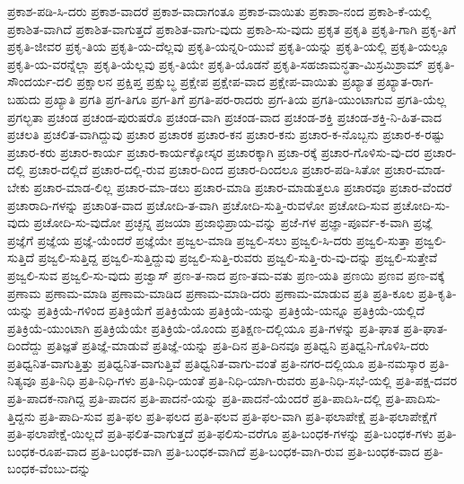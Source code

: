 {ಪ್ರಕಾಶ-ಪಡಿ-ಸಿ-ದರು
ಪ್ರಕಾಶ-ವಾದರೆ
ಪ್ರಕಾಶ-ವಾದಾಗಂತೂ
ಪ್ರಕಾಶ-ವಾಯಿತು
ಪ್ರಕಾಶಾ-ನಂದ
ಪ್ರಕಾಶಿ-ಕೆ-ಯಲ್ಲಿ
ಪ್ರಕಾಶಿತ-ವಾಗಿದೆ
ಪ್ರಕಾಶಿತ-ವಾಗುತ್ತದೆ
ಪ್ರಕಾಶಿತ-ವಾಗು-ವುದು
ಪ್ರಕಾಶಿ-ಸು-ವುದು
ಪ್ರಕೃತ
ಪ್ರಕೃತಿ
ಪ್ರಕೃತಿ-ಗಾಗಿ
ಪ್ರಕೃ-ತಿಗೆ
ಪ್ರಕೃತಿ-ಜೀವರ
ಪ್ರಕೃ-ತಿಯ
ಪ್ರಕೃತಿ-ಯ-ದೆಲ್ಲವು
ಪ್ರಕೃತಿ-ಯನ್ನರಿ-ಯುವೆ
ಪ್ರಕೃತಿ-ಯನ್ನು
ಪ್ರಕೃತಿ-ಯಲ್ಲಿ
ಪ್ರಕೃತಿ-ಯಲ್ಲೂ
ಪ್ರಕೃತಿ-ಯ-ವರನ್ನೆಲ್ಲಾ
ಪ್ರಕೃತಿ-ಯೆಲ್ಲವು
ಪ್ರಕೃ-ತಿಯೇ
ಪ್ರಕೃತಿ-ಯೊಡನೆ
ಪ್ರಕೃತಿ-ಸಹಜಾಮನ್ಧತಾ-ಮಿಸ್ರಮಿಶ್ರಾಮ್
ಪ್ರಕೃತಿ-ಸೌಂದರ್ಯ-ದಲಿ
ಪ್ರಕ್ಷಾಲನ
ಪ್ರಕ್ಷಿಪ್ತ
ಪ್ರಕ್ಷುಬ್ಧ
ಪ್ರಕ್ಷೇಪ
ಪ್ರಕ್ಷೇಪ-ವಾದ
ಪ್ರಕ್ಷೇಪ-ವಾಯಿತು
ಪ್ರಖ್ಯಾತ
ಪ್ರಖ್ಯಾತ-ರಾಗ-ಬಹುದು
ಪ್ರಖ್ಯಾತಿ
ಪ್ರಗತಿ
ಪ್ರಗ-ತಿಗೂ
ಪ್ರಗ-ತಿಗೆ
ಪ್ರಗತಿ-ಪರ-ರಾದರು
ಪ್ರಗ-ತಿಯ
ಪ್ರಗತಿ-ಯುಂಟಾಗುವ
ಪ್ರಗತಿ-ಯೆಲ್ಲ
ಪ್ರಗಲ್ಭತಾ
ಪ್ರಚಂಡ
ಪ್ರಚಂಡ-ಪುರುಷರೊ
ಪ್ರಚಂಡ-ವಾಗಿ
ಪ್ರಚಂಡ-ವಾದ
ಪ್ರಚಂಡ-ಶಕ್ತಿ
ಪ್ರಚಂಡ-ಶಕ್ತಿ-ನಿ-ಹಿತ-ವಾದ
ಪ್ರಚಲತಿ
ಪ್ರಚಲಿತ-ವಾಗಿದ್ದುವು
ಪ್ರಚಾರ
ಪ್ರಚಾರಕ
ಪ್ರಚಾರ-ಕನ
ಪ್ರಚಾರ-ಕನು
ಪ್ರಚಾರ-ಕ-ನೊಬ್ಬನು
ಪ್ರಚಾರ-ಕ-ರಷ್ಟು
ಪ್ರಚಾರ-ಕರು
ಪ್ರಚಾರ-ಕಾರ್ಯ
ಪ್ರಚಾರ-ಕಾರ್ಯಕ್ಕೋಸ್ಕರ
ಪ್ರಚಾರಕ್ಕಾಗಿ
ಪ್ರಚಾ-ರಕ್ಕೆ
ಪ್ರಚಾರ-ಗೊಳಿಸು-ವು-ದರ
ಪ್ರಚಾರ-ದಲ್ಲಿ
ಪ್ರಚಾರ-ದಲ್ಲಿದೆ
ಪ್ರಚಾರ-ದಲ್ಲಿ-ರುವ
ಪ್ರಚಾರ-ದಿಂದ
ಪ್ರಚಾರ-ದಿಂದಲೂ
ಪ್ರಚಾರ-ಪಡಿ-ಸಿತೋ
ಪ್ರಚಾರ-ಮಾಡ-ಬೇಕು
ಪ್ರಚಾರ-ಮಾಡ-ಲಿಲ್ಲ
ಪ್ರಚಾರ-ಮಾ-ಡಲು
ಪ್ರಚಾರ-ಮಾಡಿ
ಪ್ರಚಾರ-ಮಾಡುತ್ತಲೂ
ಪ್ರಚಾರವೂ
ಪ್ರಚಾರ-ವೆಂದರೆ
ಪ್ರಚಾರಾದಿ-ಗಳನ್ನು
ಪ್ರಚಾರಿತ-ವಾದ
ಪ್ರಚೋದಿ-ತ-ವಾಗಿ
ಪ್ರಚೋದಿ-ಸುತ್ತಿ-ರುವಳೋ
ಪ್ರಚೋದಿ-ಸುವ
ಪ್ರಚೋದಿ-ಸು-ವುದು
ಪ್ರಚೋದಿ-ಸು-ವುದೋ
ಪ್ರಚ್ಛನ್ನ
ಪ್ರಜಯಾ
ಪ್ರಜಾಭಿಪ್ರಾಯ-ವನ್ನು
ಪ್ರಜೆ-ಗಳ
ಪ್ರಜ್ಞಾ-ಪೂರ್ವ-ಕ-ವಾಗಿ
ಪ್ರಜ್ಞೆ
ಪ್ರಜ್ಞೆಗೆ
ಪ್ರಜ್ಞೆಯ
ಪ್ರಜ್ಞೆ-ಯೆಂದರೆ
ಪ್ರಜ್ಞೆಯೇ
ಪ್ರಜ್ವಲ-ಮಾಡಿ
ಪ್ರಜ್ವಲಿ-ಸಲು
ಪ್ರಜ್ವಲಿ-ಸಿ-ದರು
ಪ್ರಜ್ವಲಿ-ಸುತ್ತಾ
ಪ್ರಜ್ವಲಿ-ಸುತ್ತಿದೆ
ಪ್ರಜ್ವಲಿ-ಸುತ್ತಿದ್ದ
ಪ್ರಜ್ವಲಿ-ಸುತ್ತಿದ್ದುವು
ಪ್ರಜ್ವಲಿ-ಸುತ್ತಿ-ರುವರು
ಪ್ರಜ್ವಲಿ-ಸುತ್ತಿ-ರು-ವು-ದನ್ನು
ಪ್ರಜ್ವಲಿ-ಸುತ್ತೇವೆ
ಪ್ರಜ್ವಲಿ-ಸುವ
ಪ್ರಜ್ವಲಿ-ಸು-ವುದು
ಪ್ರಜ್ವಾಸ್
ಪ್ರಣ-ತ-ನಾದ
ಪ್ರಣ-ತಮ-ವತು
ಪ್ರಣ-ಯತಿ
ಪ್ರಣಯಿ
ಪ್ರಣವ
ಪ್ರಣ-ವಕ್ಕೆ
ಪ್ರಣಾಮ
ಪ್ರಣಾಮ-ಮಾಡಿ
ಪ್ರಣಾಮ-ಮಾಡಿದ
ಪ್ರಣಾಮ-ಮಾಡಿ-ದರು
ಪ್ರಣಾಮ-ಮಾಡುವ
ಪ್ರತಿ
ಪ್ರತಿ-ಕೂಲ
ಪ್ರತಿ-ಕೃತಿ-ಯನ್ನು
ಪ್ರತಿಕ್ರಿಯೆ-ಗಳಿಂದ
ಪ್ರತಿಕ್ರಿಯೆಗೆ
ಪ್ರತಿಕ್ರಿಯೆಯ
ಪ್ರತಿಕ್ರಿಯೆ-ಯನ್ನು
ಪ್ರತಿಕ್ರಿಯೆ-ಯನ್ನೂ
ಪ್ರತಿಕ್ರಿಯೆ-ಯಲ್ಲಿದೆ
ಪ್ರತಿಕ್ರಿಯೆ-ಯುಂಟಾಗಿ
ಪ್ರತಿಕ್ರಿಯೆಯೇ
ಪ್ರತಿಕ್ರಿಯೆ-ಯೊಂದು
ಪ್ರತಿಕ್ಷಣ-ದಲ್ಲಿಯೂ
ಪ್ರತಿ-ಗಳನ್ನು
ಪ್ರತಿ-ಘಾತ
ಪ್ರತಿ-ಘಾತ-ದಿಂದೆದ್ದು
ಪ್ರತಿಜ್ಞತೆ
ಪ್ರತಿಜ್ಞೆ-ಮಾಡುವೆ
ಪ್ರತಿಜ್ಞೆ-ಯನ್ನು
ಪ್ರತಿ-ದಿನ
ಪ್ರತಿ-ದಿನವೂ
ಪ್ರತಿಧ್ವನಿ
ಪ್ರತಿಧ್ವನಿ-ಗೊಳಿಸಿ-ದರು
ಪ್ರತಿಧ್ವನಿತ-ವಾಗುತ್ತಿತ್ತು
ಪ್ರತಿಧ್ವನಿತ-ವಾಗುತ್ತಿವೆ
ಪ್ರತಿಧ್ವನಿತ-ವಾಗು-ವಂತೆ
ಪ್ರತಿ-ನಗರ-ದಲ್ಲಿಯೂ
ಪ್ರತಿ-ನಮಸ್ಕಾರ
ಪ್ರತಿ-ನಿತ್ಯವೂ
ಪ್ರತಿ-ನಿಧಿ
ಪ್ರತಿ-ನಿಧಿ-ಗಳು
ಪ್ರತಿ-ನಿಧಿ-ಯಂತೆ
ಪ್ರತಿ-ನಿಧಿ-ಯಾಗಿ-ರುವರು
ಪ್ರತಿ-ನಿಧಿ-ಸಭೆ-ಯಲ್ಲಿ
ಪ್ರತಿ-ಪಕ್ಷ-ದವರ
ಪ್ರತಿ-ಪಾದಕ-ನಾಗಿದ್ದ
ಪ್ರತಿ-ಪಾದನ
ಪ್ರತಿ-ಪಾದನೆ-ಯನ್ನು
ಪ್ರತಿ-ಪಾದನೆ-ಯೆಂದರೆ
ಪ್ರತಿ-ಪಾದಿಸಿ-ದಲ್ಲಿ
ಪ್ರತಿ-ಪಾದಿಸು-ತ್ತಿದ್ದನು
ಪ್ರತಿ-ಪಾದಿ-ಸುವ
ಪ್ರತಿ-ಫಲ
ಪ್ರತಿ-ಫಲದ
ಪ್ರತಿ-ಫಲವ
ಪ್ರತಿ-ಫಲ-ವಾಗಿ
ಪ್ರತಿ-ಫಲಾಪೇಕ್ಷೆ
ಪ್ರತಿ-ಫಲಾಪೇಕ್ಷೆಗೆ
ಪ್ರತಿ-ಫಲಾಪೇಕ್ಷೆ-ಯಿಲ್ಲದೆ
ಪ್ರತಿ-ಫಲಿತ-ವಾಗುತ್ತದೆ
ಪ್ರತಿ-ಫಲಿಸು-ವರೆಗೂ
ಪ್ರತಿ-ಬಂಧಕ-ಗಳನ್ನು
ಪ್ರತಿ-ಬಂಧಕ-ಗಳು
ಪ್ರತಿ-ಬಂಧಕ-ರೂಪ-ವಾದ
ಪ್ರತಿ-ಬಂಧಕ-ವಾಗಿ
ಪ್ರತಿ-ಬಂಧಕ-ವಾಗಿದೆ
ಪ್ರತಿ-ಬಂಧಕ-ವಾಗಿ-ರುವ
ಪ್ರತಿ-ಬಂಧಕ-ವಾದ
ಪ್ರತಿ-ಬಂಧಕ-ವೆಂಬು-ದನ್ನು
}

